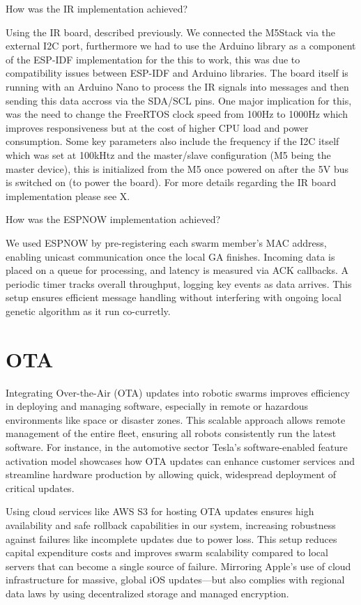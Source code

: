 \documentclass{report}
\begin{document}
How was the IR implementation achieved?

Using the IR board, described previously. We connected the M5Stack via the external I2C port, furthermore we had to use the Arduino library as a component of the ESP-IDF implementation for the this to work, this was due to compatibility issues between ESP-IDF and Arduino libraries. The board itself is running with an Arduino Nano to process the IR signals into messages and then sending this data accross via the SDA/SCL pins. One major implication for this, was the need to change the FreeRTOS clock speed from 100Hz to 1000Hz which improves responsiveness but at the cost of higher CPU load and power consumption. Some key parameters also include the frequency if the I2C itself which was set at 100kHtz and the master/slave configuration (M5 being the master device), this is initialized from the M5 once powered on after the 5V bus is switched on (to power the board). For more details regarding the IR board implementation please see X. 

How was the ESPNOW implementation achieved?

We used ESPNOW by pre-registering each swarm member’s MAC address, enabling unicast communication once the local GA finishes. Incoming data is placed on a queue for processing, and latency is measured via ACK callbacks. A periodic timer tracks overall throughput, logging key events as data arrives. This setup ensures efficient message handling without interfering with ongoing local genetic algorithm as it run co-curretly.


\section{OTA}


Integrating Over-the-Air (OTA) updates into robotic swarms improves efficiency in deploying and managing software, especially in remote or hazardous environments like space or disaster zones. This scalable approach allows remote management of the entire fleet, ensuring all robots consistently run the latest software. For instance, in the automotive sector Tesla's software-enabled feature activation model showcases how OTA updates can enhance customer services and streamline hardware production by allowing quick, widespread deployment of critical updates.

Using cloud services like AWS S3 for hosting OTA updates ensures high availability and safe rollback capabilities in our system, increasing robustness against failures like incomplete updates due to power loss. This setup reduces capital expenditure costs and improves swarm scalability compared to local servers that can become a single source of failure. Mirroring Apple’s use of cloud infrastructure for massive, global iOS updates—but also complies with regional data laws by using decentralized storage and managed encryption.
\end{document}
